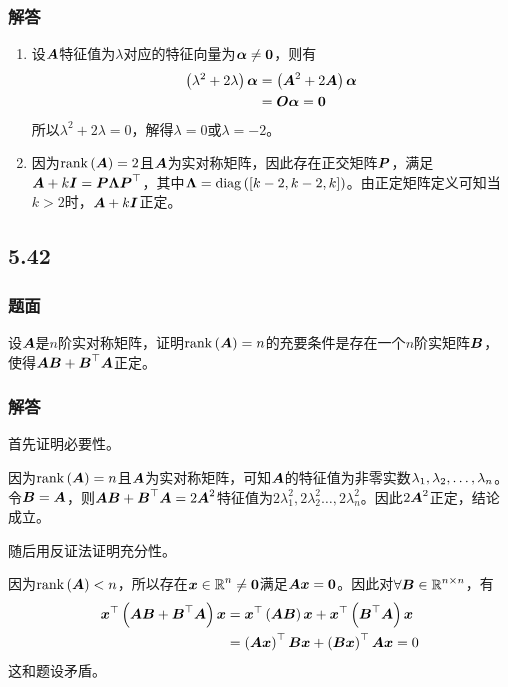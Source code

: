 \documentclass[9pt,xcolor=svgnames]{beamer} %
\begin{document}
\begin{frame}
    \frametitle{解答}
    \begin{enumerate}
        \item {
              设\(\mata\)特征值为\(\lambda\)对应的特征向量为\(\vecal\neq\veczero\)，则有
              \begin{align*}
                  \spar{\lambda^2+2\lambda}\vecal & =\spar{\mata^2+2\mata}\vecal \\
                                                  & =\mato\vecal=\veczero
              \end{align*}
              所以\(\lambda^2+2\lambda=0\)，解得\(\lambda=0\)或\(\lambda=-2\)。
              }\pause
        \item {
              因为\(\rank{\mata}=2\)且\(\mata\)为实对称矩阵，因此存在正交矩阵\(\matp\)，满足\(\mata+k\mati=\matp\matlam\matp^\top\)，其中\(\matlam=\diag{\mat{k-2,k-2,k}}\)。由正定矩阵定义可知当\(k>2\)时，\(\mata+k\mati\)正定。
              }
    \end{enumerate}
\end{frame}

\subsection*{5.42}
\begin{frame}
    \frametitle{题面}
    设\(\mata\)是\(n\)阶实对称矩阵，证明\(\rank{\mata}=n\)的充要条件是存在一个\(n\)阶实矩阵\(\matb\)，使得\(\mata\matb+\matb^\top\mata\)正定。
\end{frame}

\begin{frame}
    \frametitle{解答}
    首先证明必要性。

    因为\(\rank{\mata}=n\)且\(\mata\)为实对称矩阵，可知\(\mata\)的特征值为非零实数\(\enums{\lambda}{n}\)。
    令\(\matb=\mata\)，则\(\mata\matb+\matb^\top\mata=2\mata^2\)特征值为\(2\lambda_1^2,2\lambda_2^2\dots,2\lambda_n^2\)。因此\(2\mata^2\)正定，结论成立。
    \pause

    随后用反证法证明充分性。

    因为\(\rank{\mata}<n\)，所以存在\(\vecx\in\rea^n\neq\veczero\)满足\(\mata\vecx=\veczero\)。因此对\(\forall\matb\in\rea^{n\times n}\)，有
    \begin{align*}
        \vecx^\top\spar{\mata\matb+\matb^\top\mata}\vecx & =\vecx^\top\spar{\mata\matb}\vecx+\vecx^\top\spar{\matb^\top\mata}\vecx \\
                                                         & =\spar{\mata\vecx}^\top\matb\vecx+\spar{\matb\vecx}^\top\mata\vecx=0
    \end{align*}
    这和题设矛盾。
\end{frame}
\end{document}
